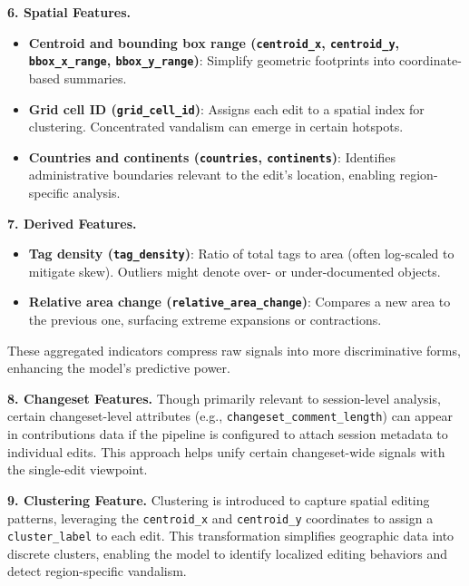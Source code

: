 \documentclass[
    13pt, %
    a4paper, %
    listof=totoc, %
    bibliography=totoc, %
    index=totoc, %
    headsepline
]{scrreprt}
\begin{document}
\newpage
\noindent
\textbf{6. Spatial Features.}
\begin{itemize}
  \item \textbf{Centroid and bounding box range (\texttt{centroid\_x}, \texttt{centroid\_y}, \newline \texttt{bbox\_x\_range}, \texttt{bbox\_y\_range})}: Simplify geometric footprints into coordinate-based summaries. 
  \item \textbf{Grid cell ID (\texttt{grid\_cell\_id})}: Assigns each edit to a spatial index for clustering. Concentrated vandalism can emerge in certain hotspots.
  \item \textbf{Countries and continents (\texttt{countries}, \texttt{continents})}: Identifies administrative boundaries relevant to the edit’s location, enabling region-specific analysis.
\end{itemize}

\vspace{1em}
\noindent
\textbf{7. Derived Features.}
\begin{itemize}
  \item \textbf{Tag density (\texttt{tag\_density})}: Ratio of total tags to area (often log-scaled to mitigate skew). Outliers might denote over- or under-documented objects.
  \item \textbf{Relative area change (\texttt{relative\_area\_change})}: Compares a new area to the previous one, surfacing extreme expansions or contractions.
\end{itemize}
These aggregated indicators compress raw signals into more discriminative forms, enhancing the model’s predictive power.

\vspace{1em}
\noindent
\textbf{8. Changeset Features.}
Though primarily relevant to session-level analysis, certain changeset-level attributes (e.g., \texttt{changeset\_comment\_length}) can appear in contributions data if the pipeline is configured to attach session metadata to individual edits. This approach helps unify certain changeset-wide signals with the single-edit viewpoint.

\vspace{1em}
\noindent
\textbf{9. Clustering Feature.}  
Clustering is introduced to capture spatial editing patterns, leveraging the \texttt{centroid\_x} and \texttt{centroid\_y} coordinates to assign a \texttt{cluster\_label} to each edit. This transformation simplifies geographic data into discrete clusters, enabling the model to identify localized editing behaviors and detect region-specific vandalism. 
\end{document}
